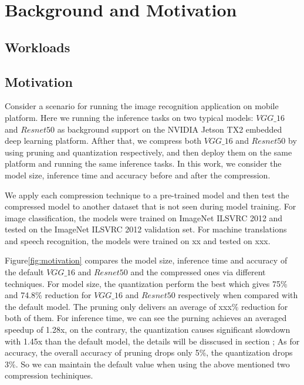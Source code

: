
\section{Background and Motivation}
\subsection{Workloads}

\subsection{Motivation}
Consider a scenario for running the image recognition application on mobile platform.
Here we running the inference tasks on
two typical models: $VGG\_16$ and $Resnet50$ as background
support on the NVIDIA Jetson TX2 embedded deep learning platform.
Afther that, we compress both $VGG\_16$ and $Resnet50$ by using pruning
and quantization respectively, and then deploy them on the same platform
and running the same inference tasks.
In this work, we consider the
model size, inference time and accuracy before and after the compression.

 We apply each compression technique to a pre-trained model and then test the compressed model to another dataset that
is not seen during model training. For image classification, the \CNN models were trained on ImageNet ILSVRC 2012 and tested on the
ImageNet ILSVRC 2012 validation set. For machine translations and speech recognition, the models were trained on xx and tested on xxx.


Figure\ref{fig:motivation} compares the model size, inference time and accuracy of the default
$VGG\_16$ and $Resnet50$ and the compressed ones via different techniques.
For model size, the quantization perform the best which gives 75\% and 74.8\%
reduction for $VGG\_16$ and $Resnet50$ respectively when compared with the default model.
The pruning only delivers an average of xxx\% reduction for both of them.
For inference time, we can see the purning achieves an averaged speedup of 1.28x,
on the contrary, the quantization causes significant slowdown with 1.45x than the default model,
the details will be disscused in section \FIXME{};
As for accuracy,  the overall accuracy of pruning drops only 5\%, the quantization drops 3\%.
So we can maintain the default value when using the above mentioned two compression techiniques.

